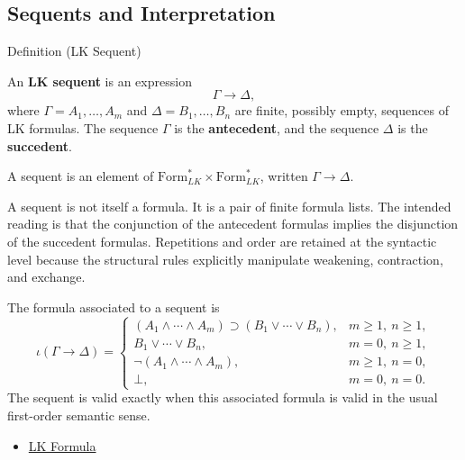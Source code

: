 \subsection{Sequents and Interpretation}

\begin{definitionbox}{Definition (LK Sequent)}
\begin{definition}[LK Sequent]\label{def:lk-sequent}
An \textbf{LK sequent} is an expression
\[
  \Gamma \to \Delta,
\]
where $\Gamma = A_1,\ldots,A_m$ and $\Delta = B_1,\ldots,B_n$ are finite,
possibly empty, sequences of LK formulas. The sequence $\Gamma$ is the
\textbf{antecedent}, and the sequence $\Delta$ is the \textbf{succedent}.
\end{definition}
\end{definitionbox}

\begin{remark*}
A sequent is an element of $\mathrm{Form}_{LK}^{*}\times
\mathrm{Form}_{LK}^{*}$, written $\Gamma \to \Delta$.
\end{remark*}

\begin{remark*}[Interpretation]
A sequent is not itself a formula. It is a pair of finite formula lists. The
intended reading is that the conjunction of the antecedent formulas implies
the disjunction of the succedent formulas. Repetitions and order are retained
at the syntactic level because the structural rules explicitly manipulate
weakening, contraction, and exchange.
\end{remark*}

\begin{remark*}[Exposition]
The formula associated to a sequent is
\[
\iota(\Gamma \to \Delta) =
\begin{cases}
(A_1 \land \cdots \land A_m) \supset (B_1 \lor \cdots \lor B_n),
  & m \geq 1,\ n \geq 1,\\
B_1 \lor \cdots \lor B_n,
  & m = 0,\ n \geq 1,\\
\lnot(A_1 \land \cdots \land A_m),
  & m \geq 1,\ n = 0,\\
\bot,
  & m = 0,\ n = 0.
\end{cases}
\]
The sequent is valid exactly when this associated formula is valid in the
usual first-order semantic sense.
\end{remark*}

\begin{dependencies}
\begin{itemize}
  \item \hyperref[def:lk-formula]{LK Formula}
\end{itemize}
\end{dependencies}

